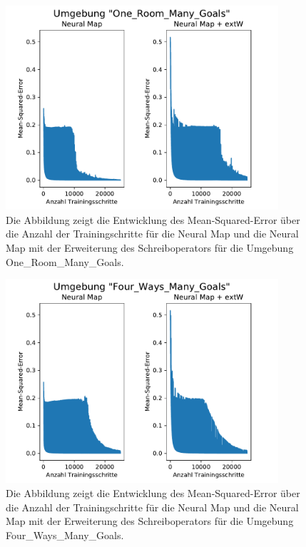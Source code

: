 \begin{figure}[ht!]
  \centering
  \includegraphics[height=0.575\textwidth, width=0.9\textwidth]{abbildungen/mem_test_ormg.pdf}
  \caption{Die Abbildung zeigt die Entwicklung des Mean-Squared-Error über die Anzahl der Trainingschritte für die Neural Map und die Neural Map mit der Erweiterung des Schreiboperators für die Umgebung \glqq One\_Room\_Many\_Goals\grqq{}.}
  \label{fig_mem_test_ormg}
\end{figure}

\begin{figure}[ht!]
  \centering
  \includegraphics[height=0.575\textwidth, width=0.9\textwidth]{abbildungen/mem_test_fwmg.pdf}
  \caption{Die Abbildung zeigt die Entwicklung des Mean-Squared-Error über die Anzahl der Trainingschritte für die Neural Map und die Neural Map mit der Erweiterung des Schreiboperators für die Umgebung \glqq Four\_Ways\_Many\_Goals\grqq{}.}
  \label{fig_mem_test_fwmg}
\end{figure}
